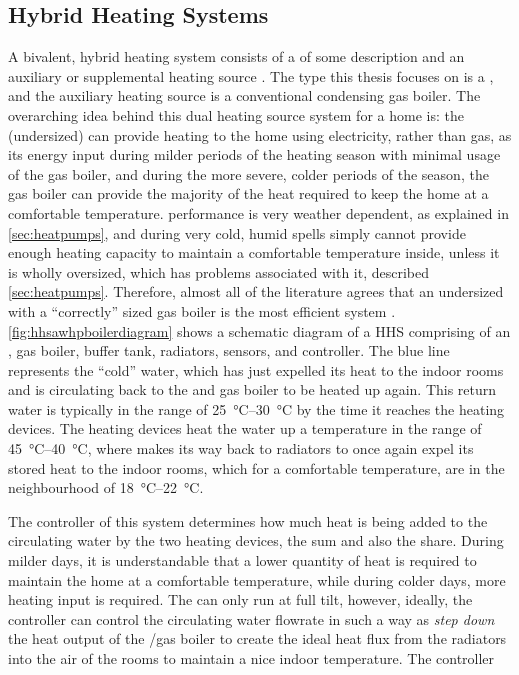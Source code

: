 \subsection{Hybrid Heating Systems}
A bivalent, hybrid \HP heating system consists of a \HP of some description and an auxiliary or supplemental heating source \cite{blackman_study_2019}. The \HP type this thesis focuses on is a \AWHP, and the auxiliary heating source is a conventional condensing gas boiler. The overarching idea behind this dual heating source system for a home is: the (undersized) \HP can provide heating to the home using electricity, rather than gas, as its energy input during milder periods of the heating season with minimal usage of the gas boiler, and during the more severe, colder periods of the season, the gas boiler can provide the majority of the heat required to keep the home at a comfortable temperature. \AWHP performance is very weather dependent, as explained in \cref{sec:heatpumps}, and during very cold, humid spells simply cannot provide enough heating capacity to maintain a comfortable temperature inside, unless it is wholly oversized, which has problems associated with it, described \cref{sec:heatpumps}. Therefore, almost all of the literature agrees that an undersized \HP with a ``correctly'' sized gas boiler is the most efficient system \cite{park_performance_2014,bagarella_annual_2016,dongellini_influence_2021,rauschkolb_cost-optimal_2020}. \cref{fig:hhsawhpboilerdiagram} shows a schematic diagram of a \ac{HHS} comprising of an \AWHP, gas boiler, buffer tank, radiators, sensors, and controller. The blue line represents the ``cold'' water, which has just expelled its heat to the indoor rooms and is circulating back to the \HP and gas boiler to be heated up again. This return water is typically in the range of \qtyrange{25}{30}{\celsius} by the time it reaches the heating devices. The heating devices heat the water up a temperature in the range of \qtyrange{45}{40}{\celsius}, where makes its way back to radiators to once again expel its stored heat to the indoor rooms, which for a comfortable temperature, are in the neighbourhood of \qtyrange{18}{22}{\celsius}.

The controller of this system determines how much heat is being added to the circulating water by the two heating devices, the sum and also the share. During milder days, it is understandable that a lower quantity of heat is required to maintain the home at a comfortable temperature, while during colder days, more heating input is required. The \AWHP can only run at full tilt, however, ideally, the controller can control the circulating water flowrate in such a way as \textit{step down} the heat output of the \AWHP/gas boiler to create the ideal heat flux from the radiators into the air of the rooms to maintain a nice indoor temperature. The controller

